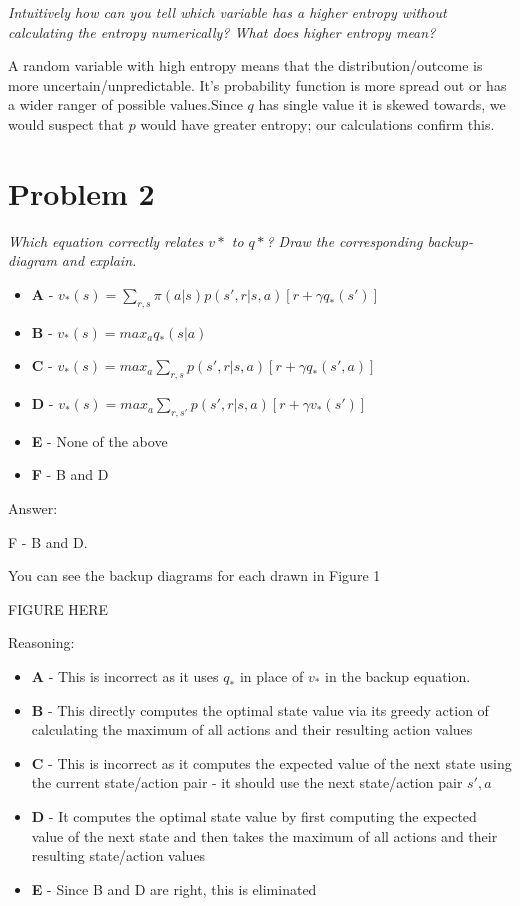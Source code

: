 \documentclass{article}
\begin{document}
\textit{Intuitively how can you tell which variable has a higher entropy without calculating the entropy numerically? What does higher entropy mean?}

A random variable with high entropy means that the distribution/outcome is more uncertain/unpredictable. It's probability function is more spread out or has a wider ranger of possible values.Since $q$ has single value it is skewed towards, we would suspect that $p$ would have greater entropy; our calculations confirm this.


\section*{Problem 2}

\textit{Which equation correctly relates $v*$ to $q*$? Draw the corresponding backup-diagram and explain.}

\begin{itemize}
    \item \textbf{A} - $v_*(s) = \sum_{r,s} \pi(a|s)p(s', r|s,a)[r+\gamma q_* (s')]$
    \item \textbf{B} - $v_*(s) = max_a q_*(s|a)$
    \item \textbf{C} - $v_*(s)= max_a \sum_{r,s} p(s', r|s,a)[r+\gamma q_*(s',a)]$
    \item \textbf{D} - $v_*(s) = max_a \sum_{r,s'} p(s',r|s, a)[r+\gamma v_*(s')] $
    \item \textbf{E} - None of the above
    \item \textbf{F} - B and D
\end{itemize}

Answer:

F - B and D.

You can see the backup diagrams for each drawn in Figure 1

FIGURE HERE

Reasoning:

\begin{itemize}
    \item \textbf{A} - This is incorrect as it uses $q_*$ in place of $v_*$ in the backup equation.
    \item \textbf{B} - This directly computes the optimal state value via its greedy action of calculating the maximum of all actions and their resulting action values
    \item \textbf{C} - This is incorrect as it computes the expected value of the next state using the current state/action pair - it should use the next state/action pair $s',a$
    \item \textbf{D} - It computes the optimal state value by first computing the expected value of the next state and then takes the maximum of all actions and their resulting state/action values
    \item \textbf{E} - Since B and D are right, this is eliminated
\end{itemize}
\end{document}
